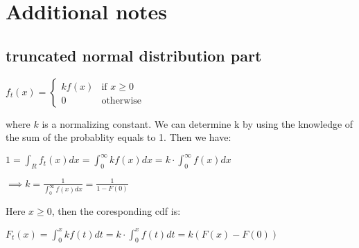 \chapter{Additional notes}



\section{truncated normal distribution part}

\begin{center}
	$f_t(x) = \begin{cases} k f(x) & \text{if } x \geqslant 0 \\ 0   & \text{otherwise } \end{cases}$
\end{center}

where $k$ is a normalizing constant. We can determine k by using the knowledge of the sum of the probablity equals to 1. Then we have: 

\begin{center}
	
	$1 = \int_{R}f_t(x) dx = \int_{0}^{\infty} k f(x)dx = k \cdot \int_{0}^{\infty} f(x) dx$
	
\end{center}

\begin{center}
	
	$\implies k = \frac{1}{\int_{0}^{\infty}f(x) dx } = \frac{1}{1 - F(0)}$
	
\end{center}

Here $x \geqslant 0 $, then the coresponding cdf is:
\begin{center}
	$F_t(x) = \int_{0}^{x} kf(t) dt =  k \cdot \int_{0}^{x} f(t) dt = k(F(x) - F(0))$
\end{center}







